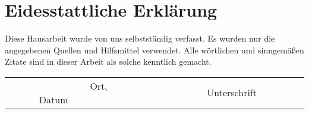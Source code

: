 \section*{Eidesstattliche Erklärung}
Diese Hausarbeit wurde von uns selbstständig verfasst. Es wurden nur die angegebenen Quellen und Hilfsmittel verwendet. Alle wörtlichen und sinngemäßen Zitate sind in dieser Arbeit als solche kenntlich gemacht.\\

\vspace{3cm}
\begin{tabular*}{\textwidth}{c@{\extracolsep\fill}cc}
	\cline{1-1}
	\cline{3-3}
	\\
	\ \ \ \ \ \ \ \ \ Ort, Datum\ \ \ \ \ \ \ \ \ \ & & \ \ \ \ \ \ \ \ \ Unterschrift\ \ \ \ \ \ \ \ \ \\
\end{tabular*}
